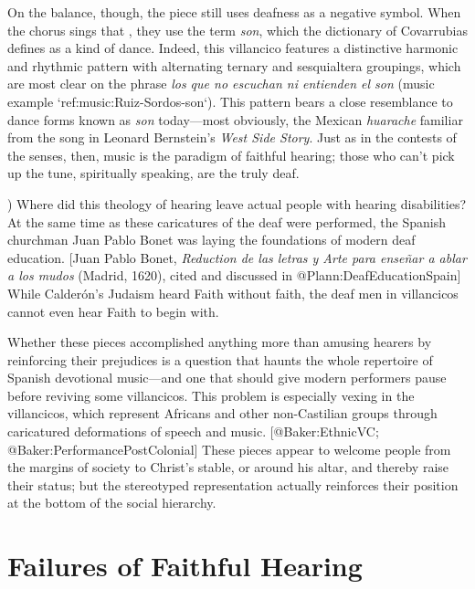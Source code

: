 On the balance, though, the piece still uses deafness as a negative symbol.
When the chorus sings that , they use the term \emph{son}, which the dictionary of Covarrubias defines as a kind of dance.
Indeed, this villancico features a distinctive harmonic and rhythmic pattern with alternating ternary and sesquialtera groupings, which are most clear on the phrase \emph{los que no escuchan ni entienden el son} (music example `ref:music:Ruiz-Sordos-son`).
This pattern bears a close resemblance to dance forms known as \emph{son} today---most obviously, the Mexican \emph{huarache} familiar from the song  in Leonard Bernstein's \emph{West Side Story}.
\Autocite[; @Wells:WestSideStory]{Grove}
Just as in the contests of the senses, then, music is the paradigm of faithful hearing; those who can't pick up the tune, spiritually speaking, are the truly deaf.


\label{music:Ruiz-Sordos-son})
Where did this theology of hearing leave actual people with hearing disabilities? At the same time as these caricatures of the deaf were performed, the Spanish churchman Juan Pablo Bonet was laying the foundations of modern deaf education.
[Juan Pablo Bonet, \emph{Reduction de las letras y Arte para enseñar a ablar a los mudos} (Madrid, 1620), cited and discussed in @Plann:DeafEducationSpain]  %
While Calderón's Judaism heard Faith without faith, the deaf men in villancicos cannot even hear Faith to begin with.

Whether these pieces accomplished anything more than amusing hearers by reinforcing their prejudices is a question that haunts the whole repertoire of Spanish devotional music---and one that should give modern performers pause before reviving some villancicos.
\Autocite[7]{Cashner:WLSCM32}
This problem is especially vexing in the  villancicos, which represent Africans and other non-Castilian groups through caricatured deformations of speech and music.
[@Baker:EthnicVC; @Baker:PerformancePostColonial]
These pieces appear to welcome people from the margins of society to Christ's stable, or around his altar, and thereby raise their status; but the stereotyped representation actually reinforces their position at the bottom of the social hierarchy.

\section{Failures of Faithful Hearing}

